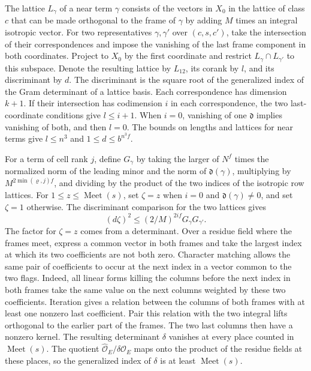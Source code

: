 The lattice \(L_\gamma\) of a near term \(\gamma\) consists of the vectors
in \(X_0\) in the lattice of class \(c\) that can be made orthogonal to the
frame of \(\gamma\) by adding \(M\) times an integral isotropic vector.
For two representatives \(\gamma,\gamma'\) over \((c,s,c')\), take the
intersection of their correspondences and impose the vanishing of the
last frame component in both coordinates. Project to \(X_0\) by the first
coordinate and restrict \(L_\gamma\cap L_{\gamma'}\) to this subspace.
Denote the resulting lattice by \(L_{12}\), its corank by \(l\), and its
discriminant by \(d\). The discriminant is the square root of the generalized
index of the Gram determinant of a lattice basis. Each correspondence has
dimension \(k+1\). If their intersection has codimension \(i\) in each
correspondence, the two last-coordinate conditions give \(l\le i+1\).
When \(i=0\), vanishing of one \(\mathfrak d\) implies vanishing of both, and
then \(l=0\). The bounds on lengths and lattices for near terms give
\(l\le n^3\) and \(1\le d\le b^{n^3 f}\).

For a term of cell rank \(j\), define \(G_\gamma\) by taking the larger of
\(N^f\) times the normalized norm of the leading minor and the norm of
\(\mathfrak d(\gamma)\), multiplying by \(M^{2\min(\varrho,j)f}\), and dividing
by the product of the two indices of the isotropic row lattices.
For \(1\le z\le\operatorname{Meet}(s)\), set \(\zeta=z\) when \(i=0\) and
\(\mathfrak d(\gamma)\ne0\), and set \(\zeta=1\) otherwise. The discriminant
comparison for the two lattices gives
\begin{equation}\label{eq:span-pair-gain}
 (d\zeta)^2\le (2/M)^{2if}G_\gamma G_{\gamma'}.
\end{equation}
The factor for \(\zeta=z\) comes from a determinant. Over a residue field
where the frames meet, express a common vector in both frames and take
the largest index at which its two coefficients are not both zero.
Character matching allows the same pair of coefficients to occur at
the next index in a vector common to the two flags. Indeed, all linear
forms killing the columns before the next index in both frames take the
same value on the next columns weighted by these two coefficients.
Iteration gives a relation between the columns of both frames with at
least one nonzero last coefficient.
Pair this relation with the two integral lifts orthogonal to the earlier
part of the frames. The two last columns then have a nonzero kernel.
The resulting determinant \(\delta\) vanishes at every place counted in
\(\operatorname{Meet}(s)\). The quotient
\(\widehat{\mathcal O}_E/\delta\widehat{\mathcal O}_E\) maps onto the product
of the residue fields at these places, so the generalized index of
\(\delta\) is at least \(\operatorname{Meet}(s)\).

